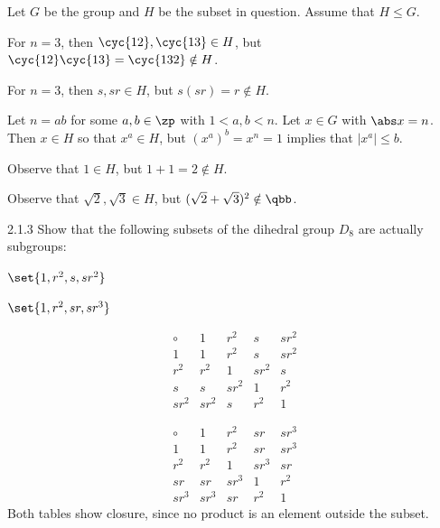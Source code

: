 \begin{sol}
    Let $G$ be the group and $H$ be the subset in question. Assume that $H \leq G$.
    \begin{subexercises}
        \item For $n = 3$, then $\cyc{1 2}, \cyc{1 3} \in H$, but $\cyc{1 2}\cyc{1 3} = \cyc{1 3 2} \notin H$.
        \item For $n = 3$, then $s, sr \in H$, but $s(sr) = r \notin H$.
        \item Let $n = ab$ for some $a, b \in \zp$ with $1 < a, b < n$.
	    Let $x \in G$ with $\abs x = n$.
	    Then $x \in H$ so that $x^a \in H$, but $(x^a)^b = x^n = 1$ implies that $|x^a| \leq b$.
        \item Observe that $1 \in H$, but $1 + 1 = 2 \notin H$.
        \item Observe that $\sqrt 2, \sqrt 3 \in H$, but $(\sqrt 2 + \sqrt 3)^2 \notin \qbb$. \qedhere
    \end{subexercises}
\end{sol}

\begin{exercise}{2.1.3}
    Show that the following subsets of the dihedral group $D_8$ are actually subgroups:
    \begin{subexercises}
        \item $\set{1, r^2, s, sr^2}$
        \item $\set{1, r^2, sr, sr^3}$
    \end{subexercises}
\end{exercise}

\begin{solenum}
    \item 
    \[
        \begin{array}{c|cccc}
            \circ & 1 & r^2 & s & sr^2 \\
            \hline
            1 & 1 & r^2 & s & sr^2 \\
            r^2 & r^2 & 1 & sr^2 & s \\
            s & s & sr^2 & 1 & r^2 \\
            sr^2 & sr^2 & s & r^2 & 1
        \end{array}
    \]
    \item 
    \[
        \begin{array}{c|cccc}
            \circ & 1 & r^2 & sr & sr^3 \\
            \hline
            1 & 1 & r^2 & sr & sr^3 \\
            r^2 & r^2 & 1 & sr^3 & sr \\
            sr & sr & sr^3 & 1 & r^2 \\
            sr^3 & sr^3 & sr & r^2 & 1
        \end{array}
    \]
    Both tables show closure, since no product is an element outside the subset.
\end{solenum}


